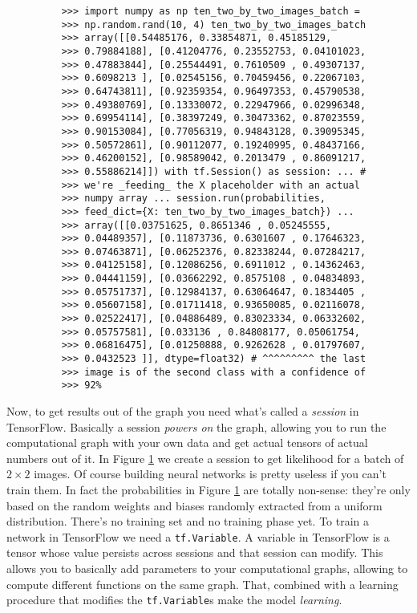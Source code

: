 \begin{figure}
  \begin{verbatim}
    >>> import numpy as np ten_two_by_two_images_batch =
    >>> np.random.rand(10, 4) ten_two_by_two_images_batch
    >>> array([[0.54485176, 0.33854871, 0.45185129,
    >>> 0.79884188], [0.41204776, 0.23552753, 0.04101023,
    >>> 0.47883844], [0.25544491, 0.7610509 , 0.49307137,
    >>> 0.6098213 ], [0.02545156, 0.70459456, 0.22067103,
    >>> 0.64743811], [0.92359354, 0.96497353, 0.45790538,
    >>> 0.49380769], [0.13330072, 0.22947966, 0.02996348,
    >>> 0.69954114], [0.38397249, 0.30473362, 0.87023559,
    >>> 0.90153084], [0.77056319, 0.94843128, 0.39095345,
    >>> 0.50572861], [0.90112077, 0.19240995, 0.48437166,
    >>> 0.46200152], [0.98589042, 0.2013479 , 0.86091217,
    >>> 0.55886214]]) with tf.Session() as session: ... #
    >>> we're _feeding_ the X placeholder with an actual
    >>> numpy array ... session.run(probabilities,
    >>> feed_dict={X: ten_two_by_two_images_batch}) ...
    >>> array([[0.03751625, 0.8651346 , 0.05245555,
    >>> 0.04489357], [0.11873736, 0.6301607 , 0.17646323,
    >>> 0.07463871], [0.06252376, 0.82338244, 0.07284217,
    >>> 0.04125158], [0.12086256, 0.6911012 , 0.14362463,
    >>> 0.04441159], [0.03662292, 0.8575108 , 0.04834893,
    >>> 0.05751737], [0.12984137, 0.63064647, 0.1834405 ,
    >>> 0.05607158], [0.01711418, 0.93650085, 0.02116078,
    >>> 0.02522417], [0.04886489, 0.83023334, 0.06332602,
    >>> 0.05757581], [0.033136 , 0.84808177, 0.05061754,
    >>> 0.06816475], [0.01250888, 0.9262628 , 0.01797607,
    >>> 0.0432523 ]], dtype=float32) # ^^^^^^^^^ the last
    >>> image is of the second class with a confidence of
    >>> 92%
  \end{verbatim}
  \label{fig:use-session}
  \caption{}
\end{figure}

Now, to get results out of the graph you need what's called a
\emph{session} in TensorFlow. Basically a session \emph{powers on} the
graph, allowing you to run the computational graph with your own data
and get actual tensors of actual numbers out of it. In Figure
\ref{fig:use-session} we create a session to get likelihood for a batch
of \( 2 \times 2 \) images. Of course building neural networks is
pretty useless if you can't train them. In fact the probabilities in
Figure \ref{fig:use-session} are totally non-sense: they're only based
on the random weights and biases randomly extracted from a uniform
distribution. There's no training set and no training phase yet. To
train a network in TensorFlow we need a \texttt{tf.Variable}. A
variable in TensorFlow is a tensor whose value persists across sessions
and that session can modify. This allows you to basically add
parameters to your computational graphs, allowing to compute different
functions on the same graph. That, combined with a learning procedure
that modifies the \texttt{tf.Variable}s make the model \emph{learning}.

